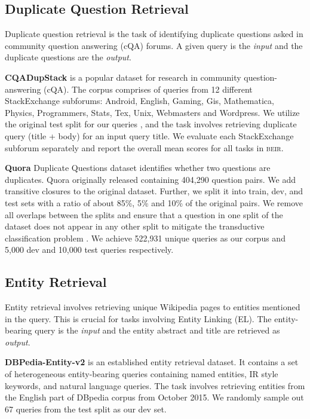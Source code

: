 \documentclass{article}
\newcommand{\custo}[1]{\textsc{\normalsize #1}}
\newcommand{\beir}{\custo{beir}\xspace}
\begin{document}
\vspace{-2mm}
\subsection{Duplicate Question Retrieval}
\vspace{-1mm}

Duplicate question retrieval is the task of identifying duplicate questions asked in community question answering (cQA) forums. A given query is the \textit{input} and the duplicate questions are the \textit{output}.

\textbf{CQADupStack} \cite{hoogeveen2015cqadupstack} is a popular dataset for research in community question-answering (cQA). The corpus  comprises of queries from 12 different StackExchange subforums: Android, English, Gaming, Gis, Mathematica, Physics, Programmers, Stats, Tex, Unix, Webmasters and Wordpress. We utilize the original test split for our queries , and the task involves retrieving duplicate query (title + body) for an input query title. We evaluate each StackExchange subforum separately and report the overall mean scores for all tasks in \beir.

\textbf{Quora} Duplicate Questions dataset identifies whether two questions are duplicates. Quora originally released containing 404,290 question pairs. We add transitive closures to the original dataset. Further, we split it into train, dev, and test sets with a ratio of about 85\%, 5\% and 10\% of the original pairs. We remove all overlaps between the splits and ensure that a question in one split of the dataset does not appear in any other split to mitigate the transductive classification problem \cite{10.1007/978-3-642-15880-3_42}. We achieve 522,931 unique queries as our corpus  and 5,000 dev and 10,000 test queries  respectively.

\vspace{-2mm}
\subsection{Entity Retrieval}
\vspace{-1mm}
Entity retrieval involves retrieving unique Wikipedia pages to entities mentioned in the query. This is crucial for tasks involving Entity Linking (EL). The entity-bearing query is the \textit{input} and the entity abstract and title are retrieved as \textit{output}.

\textbf{DBPedia-Entity-v2} \cite{Hasibi:2017:DVT} is an established entity retrieval dataset. It contains a set of heterogeneous entity-bearing queries  containing named entities, IR style keywords, and natural language queries. The task involves retrieving entities from the English part of DBpedia corpus  from October 2015. We randomly sample out 67 queries from the test split as our dev set.
\end{document}
